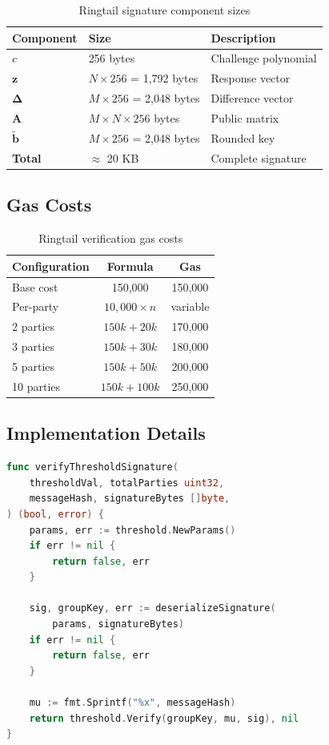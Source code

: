\documentclass[11pt,a4paper]{article}
\theoremstyle{definition}
\begin{document}
\begin{table}[h]
\centering
\begin{tabular}{lll}
\toprule
Component & Size & Description \\
\midrule
$c$ & 256 bytes & Challenge polynomial \\
$\mathbf{z}$ & $N \times 256$ = 1,792 bytes & Response vector \\
$\boldsymbol{\Delta}$ & $M \times 256$ = 2,048 bytes & Difference vector \\
$\mathbf{A}$ & $M \times N \times 256$ bytes & Public matrix \\
$\tilde{\mathbf{b}}$ & $M \times 256$ = 2,048 bytes & Rounded key \\
\midrule
\textbf{Total} & $\approx$ 20 KB & Complete signature \\
\bottomrule
\end{tabular}
\caption{Ringtail signature component sizes}
\end{table}

\subsection{Gas Costs}

\begin{table}[h]
\centering
\begin{tabular}{lcc}
\toprule
Configuration & Formula & Gas \\
\midrule
Base cost & 150,000 & 150,000 \\
Per-party & $10,000 \times n$ & variable \\
\midrule
2 parties & $150k + 20k$ & 170,000 \\
3 parties & $150k + 30k$ & 180,000 \\
5 parties & $150k + 50k$ & 200,000 \\
10 parties & $150k + 100k$ & 250,000 \\
\bottomrule
\end{tabular}
\caption{Ringtail verification gas costs}
\end{table}

\subsection{Implementation Details}

\begin{lstlisting}[language=Go]
func verifyThresholdSignature(
    thresholdVal, totalParties uint32,
    messageHash, signatureBytes []byte,
) (bool, error) {
    params, err := threshold.NewParams()
    if err != nil {
        return false, err
    }

    sig, groupKey, err := deserializeSignature(
        params, signatureBytes)
    if err != nil {
        return false, err
    }

    mu := fmt.Sprintf("%x", messageHash)
    return threshold.Verify(groupKey, mu, sig), nil
}
\end{lstlisting}
\end{document}

